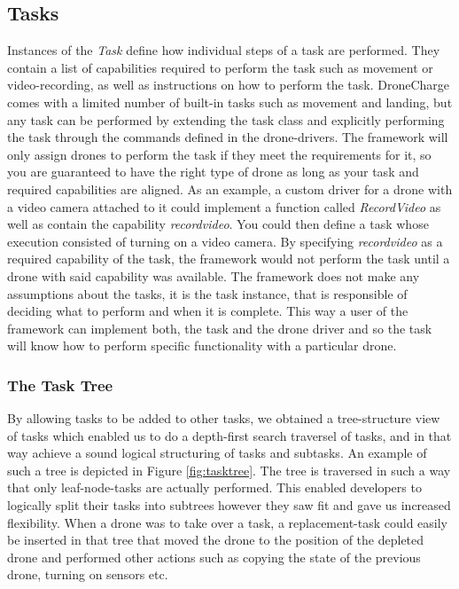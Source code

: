 \subsection{Tasks}
Instances of the \textit{Task} define how individual steps of a task are performed. They contain a list of capabilities required to perform the task such as movement or video-recording, as well as instructions on how to perform the task. DroneCharge comes with a limited number of built-in tasks such as movement and landing, but any task can be performed by extending the task class and explicitly performing the task through the commands defined in the drone-drivers. The framework will only assign drones to perform the task if they meet the requirements for it, so you are guaranteed to have the right type of drone as long as your task and required capabilities are aligned. As an example, a custom driver for a drone with a video camera attached to it could implement a function called \textit{RecordVideo} as well as contain the capability \textit{recordvideo}. You could then define a task whose execution consisted of turning on a video camera. By specifying \textit{recordvideo} as a required capability of the task, the framework would not perform the task until a drone with said capability was available. The framework does not make any assumptions about the tasks, it is the task instance, that is responsible of deciding what to perform and when it is complete. This way a user of the framework can implement both, the task and the drone driver and so the task will know how to perform specific functionality with a particular drone.

\subsubsection{The Task Tree}
By allowing tasks to be added to other tasks, we obtained a tree-structure view of tasks which enabled us to do a depth-first search traversel of tasks, and in that way achieve a sound logical structuring of tasks and subtasks. An example of such a tree is depicted in Figure \ref{fig:tasktree}. The tree is traversed in such a way that only leaf-node-tasks are actually performed. This enabled developers to logically split their tasks into subtrees however they saw fit and gave us increased flexibility. When a drone was to take over a task, a replacement-task could easily be inserted in that tree that moved the drone to the position of the depleted drone and performed other actions such as copying the state of the previous drone, turning on sensors etc.


